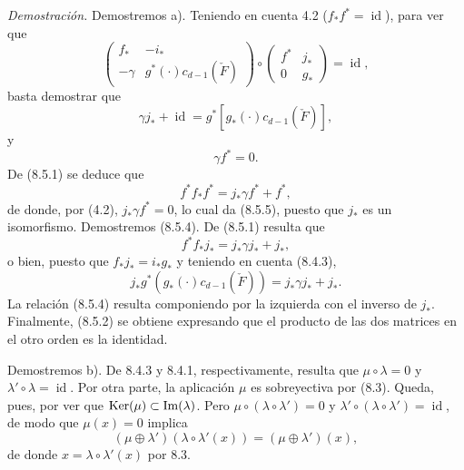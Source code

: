 \emph{Demostración.} Demostremos a). Teniendo en cuenta 4.2 ($f_*f^*=\operatorname{id}$), para ver que
\[
\begin{pmatrix}
f_*&-i_*\\
-\gamma&g^*(\cdot)c_{d-1}(\check F)
\end{pmatrix}
\circ
\begin{pmatrix}
f^*&j_*\\
0&g_*
\end{pmatrix}
=\operatorname{id},
\]
basta demostrar que
\[
\gamma j_*+\operatorname{id}=g^*[g_*(\cdot)c_{d-1}(\check F)],
\tag{8.5.4}
\]
y
\[
\gamma f^*=0.
\tag{8.5.5}
\]
De (8.5.1) se deduce que
\[
f^*f_*f^*=j_*\gamma f^*+f^*,
\]
de donde, por (4.2), $j_*\gamma f^*=0$, lo cual da (8.5.5), puesto que $j_*$ es un isomorfismo. Demostremos (8.5.4). De (8.5.1) resulta que
\[
f^*f_*j_*=j_*\gamma j_*+j_*,
\]
o bien, puesto que $f_*j_*=i_*g_*$ y teniendo en cuenta (8.4.3),
\[
j_*g^*(g_*(\cdot)c_{d-1}(\check F))=j_*\gamma j_*+j_*.
\]
La relación (8.5.4) resulta componiendo por la izquierda con el inverso de $j_*$. Finalmente, (8.5.2) se obtiene expresando que el producto de las dos matrices en el otro orden es la identidad.

Demostremos b). De 8.4.3 y 8.4.1, respectivamente, resulta que $\mu\circ\lambda=0$ y $\lambda'\circ\lambda=\operatorname{id}$. Por otra parte, la aplicación $\mu$ es sobreyectiva por (8.3). Queda, pues, por ver que $\operatorname{Ker}(\mu)\subset\operatorname{Im}(\lambda)$. Pero $\mu\circ(\lambda\circ\lambda')=0$ y $\lambda'\circ(\lambda\circ\lambda')=\operatorname{id}$, de modo que $\mu(x)=0$ implica
\[
(\mu\oplus\lambda')(\lambda\circ\lambda'(x))=(\mu\oplus\lambda')(x),
\]
de donde $x=\lambda\circ\lambda'(x)$ por 8.3.
